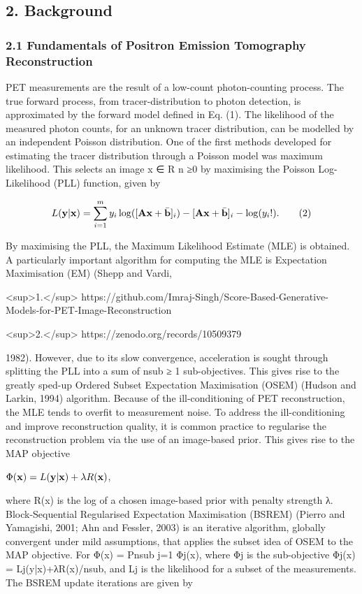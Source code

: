 \documentclass{article}
\begin{document}
\subsection{2. Background}

\subsubsection{2.1 Fundamentals of Positron Emission Tomography Reconstruction}

PET measurements are the result of a low-count photon-counting process. The true forward process, from tracer-distribution to photon detection, is approximated by the forward model defined in Eq. (1). The likelihood of the measured photon counts, for an unknown tracer distribution, can be modelled by an independent Poisson distribution. One of the first methods developed for estimating the tracer distribution through a Poisson model was maximum likelihood. This selects an image x ∈ R n ≥0 by maximising the Poisson Log-Likelihood (PLL) function, given by

$$L({\bf y}|{\bf x})=\sum_{i=1}^{m}y_{i}\log([{\bf Ax}+\bar{\bf b}]_{i})-[{\bf Ax}+\bar{\bf b}]_{i}-\log(y_{i}!).\tag{2}$$

By maximising the PLL, the Maximum Likelihood Estimate (MLE) is obtained. A particularly important algorithm for computing the MLE is Expectation Maximisation (EM) (Shepp and Vardi,

<sup>1.</sup> https://github.com/Imraj-Singh/Score-Based-Generative-Models-for-PET-Image-Reconstruction

<sup>2.</sup> https://zenodo.org/records/10509379

1982). However, due to its slow convergence, acceleration is sought through splitting the PLL into a sum of nsub ≥ 1 sub-objectives. This gives rise to the greatly sped-up Ordered Subset Expectation Maximisation (OSEM) (Hudson and Larkin, 1994) algorithm. Because of the ill-conditioning of PET reconstruction, the MLE tends to overfit to measurement noise. To address the ill-conditioning and improve reconstruction quality, it is common practice to regularise the reconstruction problem via the use of an image-based prior. This gives rise to the MAP objective

$\Phi({\bf x})=L({\bf y}|{\bf x})+\lambda R({\bf x})$,

where R(x) is the log of a chosen image-based prior with penalty strength λ. Block-Sequential Regularised Expectation Maximisation (BSREM) (Pierro and Yamagishi, 2001; Ahn and Fessler, 2003) is an iterative algorithm, globally convergent under mild assumptions, that applies the subset idea of OSEM to the MAP objective. For Φ(x) = Pnsub j=1 Φj(x), where Φj is the sub-objective Φj(x) = Lj(y|x)+λR(x)/nsub, and Lj is the likelihood for a subset of the measurements. The BSREM update iterations are given by
\end{document}
